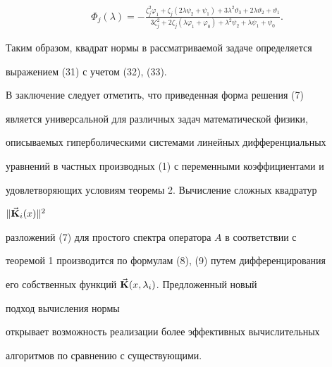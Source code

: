 \begin{exam}
\begin{equation}
\begin{split}
&\Phi_j(\lambda)=- 


\frac{\zeta^2_j\varphi_1+\zeta_j(2\lambda\psi_2+\psi_1)+ 


3\lambda^2\vartheta_3+2\lambda\vartheta_2+\vartheta_1} 


{3\zeta^2_j+2\zeta_j(\lambda\varphi_1+\varphi_0)+ 


\lambda^2\psi_2+\lambda\psi_1+\psi_0}. 


\end{split} 


\end{equation} 


Таким образом, квадрат нормы в рассматриваемой задаче определяется 


выражением (31) с учетом (32), (33). 


\end{exam}


 


В заключение следует отметить, что приведенная форма решения (7) 


является универсальной для различных задач математической физики, 


описываемых гиперболическими системами линейных дифференциальных 


уравнений в частных производных (1) с переменными коэффициентами и 


удовлетворяющих условиям теоремы 2. Вычисление сложных квадратур 


$\|\Vec{\bold{K}}_i(x)\|^2$ 


разложений (7) для простого спектра оператора $A$ в соответствии с 


теоремой 1 производится по формулам (8), (9) путем дифференцирования 


его собственных функций $\Vec{\bold{K}}(x,\lambda_i)$. Предложенный новый 


подход вычисления нормы 


открывает возможность реализации более эффективных вычислительных 


алгоритмов по сравнению с существующими. 


 


